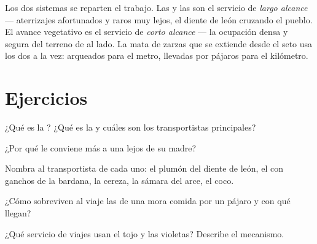\begin{remark}\label{rem:g6:how-plants-spread:twospeeds}
Los dos sistemas se reparten el trabajo. Las  y las  son
el servicio de \emph{largo alcance} --- aterrizajes afortunados y raros
muy lejos, el diente de león cruzando el pueblo. El avance vegetativo
es el servicio de \emph{corto alcance} --- la ocupación densa y segura
del terreno de al lado. La mata de zarzas que se extiende desde el seto
usa los dos a la vez:  arqueados para el metro,  llevadas
por pájaros para el kilómetro.
\end{remark}

\section{Ejercicios}

\begin{exercise}[$\star$]\label{exo:g6:how-plants-spread:1}
¿Qué es la ? ¿Qué es la  y cuáles son los
transportistas principales?
\end{exercise}

\begin{exercise}[$\star$]\label{exo:g6:how-plants-spread:2}
¿Por qué le conviene más a una   lejos de su madre?
\end{exercise}

\begin{exercise}[$\star$]\label{exo:g6:how-plants-spread:3}
Nombra al transportista de cada uno: el plumón del diente de león, el
 con ganchos de la bardana, la cereza, la sámara del arce, el coco.
\end{exercise}

\begin{exercise}[$\star$]\label{exo:g6:how-plants-spread:4}
¿Cómo sobreviven al viaje las  de una mora comida por un
pájaro y con qué llegan?
\end{exercise}

\begin{exercise}[$\star$]\label{exo:g6:how-plants-spread:5}
¿Qué servicio de viajes usan el tojo y las violetas? Describe el
mecanismo.
\end{exercise}

